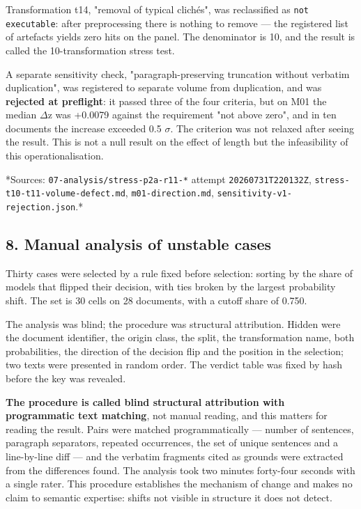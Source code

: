\documentclass[11pt,a4paper]{article}
\renewcommand{\_}{\textunderscore\allowbreak}
\begin{document}
Transformation t14, "removal of typical clich\'es", was reclassified as \texttt{not executable}:
after preprocessing there is nothing to remove — the registered list of artefacts yields
zero hits on the panel. The denominator is 10, and the result is called the
10-transformation stress test.

A separate sensitivity check, "paragraph-preserving truncation without verbatim
duplication", was registered to separate volume from duplication, and was
\textbf{rejected at preflight}: it passed three of the four criteria, but on M01 the median
$\Delta$z was +0.0079 against the requirement "not above zero", and in ten documents the
increase exceeded 0.5 $\sigma$. The criterion was not relaxed after seeing the result. This is
not a null result on the effect of length but the infeasibility of this operationalisation.

*Sources: \texttt{07-\allowbreak{}analysis/stress-\allowbreak{}p2a-\allowbreak{}r11-\allowbreak{}*} attempt \texttt{20260731T220132Z},
\texttt{stress-\allowbreak{}t10-\allowbreak{}t11-\allowbreak{}volume-\allowbreak{}defect.md}, \texttt{m01-\allowbreak{}direction.md},
\texttt{sensitivity-\allowbreak{}v1-\allowbreak{}rejection.json}.*

\subsection{8. Manual analysis of unstable cases}

Thirty cases were selected by a rule fixed before selection: sorting by the share of
models that flipped their decision, with ties broken by the largest probability shift.
The set is 30 cells on 28 documents, with a cutoff share of 0.750.

The analysis was blind; the procedure was structural attribution. Hidden were the document identifier, the origin class,
the split, the transformation name, both probabilities, the direction of the decision
flip and the position in the selection; two texts were presented in random order. The
verdict table was fixed by hash before the key was revealed.

\textbf{The procedure is called blind structural attribution with programmatic text
matching}, not manual reading, and this matters for reading the result. Pairs
were matched programmatically — number of sentences, paragraph separators,
repeated occurrences, the set of unique sentences and a line-by-line diff — and the
verbatim fragments cited as grounds were extracted from the differences found. The
analysis took two minutes forty-four seconds with a single rater. This procedure
establishes the mechanism of change and makes no claim to semantic expertise: shifts
not visible in structure it does not detect.
\end{document}
